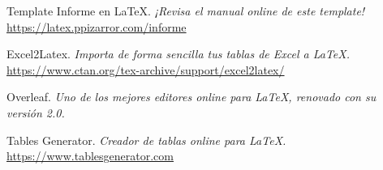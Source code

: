 \clearpage %
\begin{references}
	Template Informe en \LaTeX.
	\textit{¡Revisa el manual online de este template!} \\
	\url{https://latex.ppizarror.com/informe}

	Excel2Latex.
	\textit{Importa de forma sencilla tus tablas de Excel a \LaTeX.} \\
	\url{https://www.ctan.org/tex-archive/support/excel2latex/}

	Overleaf.
	\textit{Uno de los mejores editores online para \LaTeX, renovado con su versión 2.0.} \\
	\href{https://www.overleaf.com?r=298b935f&rm=d&rs=b}{}
	
	Tables Generator.
	\textit{Creador de tablas online para \LaTeX.}\\
	\url{https://www.tablesgenerator.com}
\end{references}